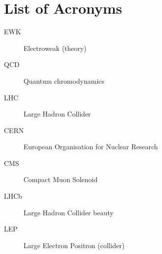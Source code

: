 \chapter{List of Acronyms}

  \begin{description}

    \item[EWK]		\dotfill	Electroweak (theory)
    \item[QCD]		\dotfill	Quantum chromodynamics
    \item[LHC]		\dotfill	Large Hadron Collider
    \item[CERN]		\dotfill	European Organisation for Nuclear Research
    \item[CMS]		\dotfill	Compact Muon Solenoid

    \item[LHCb]   \dotfill  Large Hadron Collider beauty

    \item[LEP]    \dotfill  Large Electron Positron (collider)

  \end{description}
